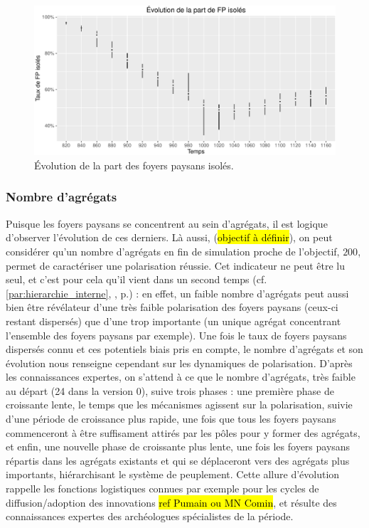 \begin{figure}[H]
\captionsetup{width=\linewidth}
\includegraphics[width=\linewidth]{img/resultats/v0_taux_FP_isoles.pdf}
\caption{Évolution de la part des foyers paysans isolés.}
\label{fig:taux-isoles-v0}
\end{figure}

\clearpage

\subsubsection{Nombre d'agrégats}

Puisque les foyers paysans se concentrent au sein d'agrégats, il est logique d'observer l'évolution de ces derniers.
Là aussi, (\hl{objectif à définir}), on peut considérer qu'un nombre d'agrégats en fin de simulation proche de l'objectif, $200$, permet de caractériser une polarisation réussie.
Cet indicateur ne peut être lu seul, et c'est pour cela qu'il vient dans un second temps (cf. \ref{par:hierarchie_interne}, , p.\pageref{par:hierarchie_interne}) :
en effet, un faible nombre d'agrégats peut aussi bien être révélateur d'une très faible polarisation des foyers paysans (ceux-ci restant dispersés) que d'une trop importante (un unique agrégat concentrant l'ensemble des foyers paysans par exemple).
Une fois le taux de foyers paysans dispersés connu et ces potentiels biais pris en compte, le nombre d'agrégats et son évolution nous renseigne cependant sur les dynamiques de polarisation.
D'après les connaissances expertes, on s'attend à ce que le nombre d'agrégats, très faible au départ (24 dans la version 0), suive trois phases :
une première phase de croissante lente, le temps que les mécanismes agissent sur la polarisation, suivie d'une période de croissance plus rapide, une fois que tous les foyers paysans commenceront à être suffisament attirés par les pôles pour y former des agrégats, et enfin, une nouvelle phase de croissante plus lente, une fois les foyers paysans répartis dans les agrégats existants et qui se déplaceront vers des agrégats plus importants, hiérarchisant le système de peuplement.
Cette allure d'évolution rappelle les fonctions logistiques connues par exemple pour les cycles de diffusion/adoption des innovations \hl{ref Pumain ou MN Comin}, et résulte des connaissances expertes des archéologues spécialistes de la période.

